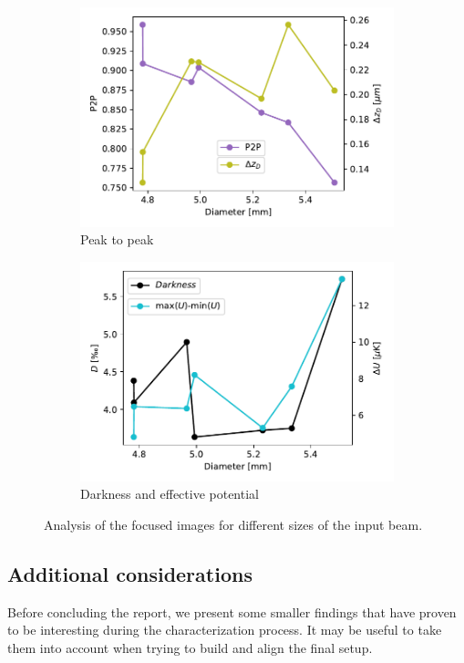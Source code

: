 \begin{figure}
    \begin{subfigure}{0.5\textwidth}
        \includegraphics[width=\textwidth]{chapters/chapter_3/figures/p2p.pdf}
        \caption{Peak to peak}
    \end{subfigure}
    \begin{subfigure}{0.5\textwidth}
        \includegraphics[width=\textwidth]{chapters/chapter_3/figures/darkenss.pdf}
        \caption{Darkness and effective potential}
        \label{fig:diam_dark}
    \end{subfigure}
    \caption{Analysis of the focused images for different sizes of the input beam.}
    \label{fig:analysis_diam}
\end{figure}

\subsection{Additional considerations}
Before concluding the report, we present some smaller findings that have proven to be interesting during the characterization process. It may be useful to take them into account when trying to build and align the final setup.

